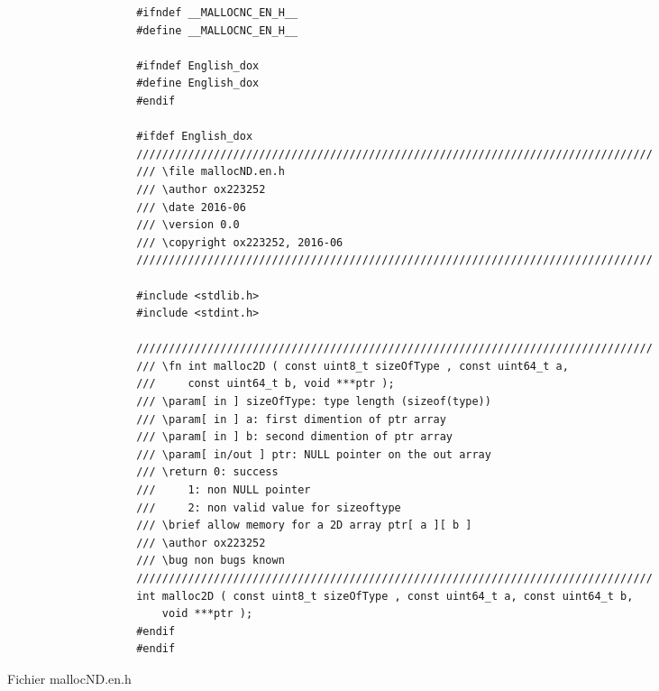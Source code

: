			\begin{figure}[H]
				\begin{changemargin}{-2.5cm}{-2.5cm}
				\begin{tcolorbox}
				\begin{verbatim}
					#ifndef __MALLOCNC_EN_H__
					#define __MALLOCNC_EN_H__

					#ifndef English_dox
					#define English_dox
					#endif

					#ifdef English_dox
					////////////////////////////////////////////////////////////////////////////////
					/// \file mallocND.en.h
					/// \author ox223252
					/// \date 2016-06
					/// \version 0.0
					/// \copyright ox223252, 2016-06
					////////////////////////////////////////////////////////////////////////////////

					#include <stdlib.h>
					#include <stdint.h>

					////////////////////////////////////////////////////////////////////////////////
					/// \fn int malloc2D ( const uint8_t sizeOfType , const uint64_t a,
					/// 	const uint64_t b, void ***ptr );
					/// \param[ in ] sizeOfType: type length (sizeof(type))
					/// \param[ in ] a: first dimention of ptr array
					/// \param[ in ] b: second dimention of ptr array
					/// \param[ in/out ] ptr: NULL pointer on the out array
					/// \return 0: success
					/// 	1: non NULL pointer
					/// 	2: non valid value for sizeoftype
					/// \brief allow memory for a 2D array ptr[ a ][ b ]
					/// \author ox223252
					/// \bug non bugs known
					////////////////////////////////////////////////////////////////////////////////
					int malloc2D ( const uint8_t sizeOfType , const uint64_t a, const uint64_t b, 
					    void ***ptr );
					#endif
					#endif
				\end{verbatim}
				\end{tcolorbox}
				\end{changemargin}
				\caption{Fichier mallocND.en.h}
			\end{figure}
						
